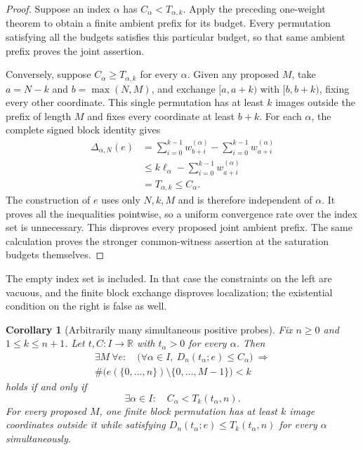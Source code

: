 \documentclass[11pt]{article}
\newtheorem{corollary}[theorem]{Corollary}
\theoremstyle{definition}
\begin{document}
\begin{proof}
Suppose an index $\alpha$ has $C_\alpha<T_{\alpha,k}$.
Apply the preceding one-weight theorem to obtain a finite
ambient prefix for its budget. Every permutation satisfying
all the budgets satisfies this particular budget, so that
same ambient prefix proves the joint assertion.

Conversely, suppose $C_\alpha\ge T_{\alpha,k}$ for every
$\alpha$. Given any proposed $M$, take $a=N-k$ and
$b=\max(N,M)$, and exchange $[a,a+k)$ with $[b,b+k)$,
fixing every other coordinate. This single permutation has
at least $k$ images outside the prefix of length $M$ and
fixes every coordinate at least $b+k$. For each $\alpha$,
the complete signed block identity gives
\[
 \begin{split}
 \Delta_{\alpha,N}(e)
   &=\sum_{i=0}^{k-1}w^{(\alpha)}_{b+i}
                   -\sum_{i=0}^{k-1}w^{(\alpha)}_{a+i}\\
   &\le k\ell_\alpha-
             \sum_{i=0}^{k-1}w^{(\alpha)}_{a+i}\\
   &=T_{\alpha,k}\le C_\alpha.
 \end{split}
\]
The construction of $e$ uses only $N,k,M$ and is therefore
independent of $\alpha$. It proves all the inequalities
pointwise, so a uniform convergence rate over the index set
is unnecessary. This disproves every proposed joint ambient
prefix. The same calculation proves the stronger common-witness
assertion at the saturation budgets themselves.
\end{proof}

The empty index set is included. In that case the constraints
on the left are vacuous, and the finite block exchange
disproves localization; the existential condition on the
right is false as well.

\begin{corollary}[Arbitrarily many simultaneous positive probes]
Fix $n\ge0$ and $1\le k\le n+1$. Let
$t,C:I\to\mathbb R$ with $t_\alpha>0$ for every $\alpha$.
Then
\[
 \begin{gathered}
 \exists M\ \forall e:\quad
 \bigl(\forall\alpha\in I,\
           D_n(t_\alpha;e)\le C_\alpha\bigr)
       \ \Longrightarrow\\
 \#\bigl(e(\{0,\ldots,n\})\setminus\{0,\ldots,M-1\}\bigr)<k
 \end{gathered}
\]
holds if and only if
\[
 \exists\alpha\in I:\quad
 C_\alpha<T_k(t_\alpha,n).
\]
For every proposed $M$, one finite block permutation has at
least $k$ image coordinates outside it while satisfying
$D_n(t_\alpha;e)\le T_k(t_\alpha,n)$ for every $\alpha$
simultaneously.
\end{corollary}
\end{document}

